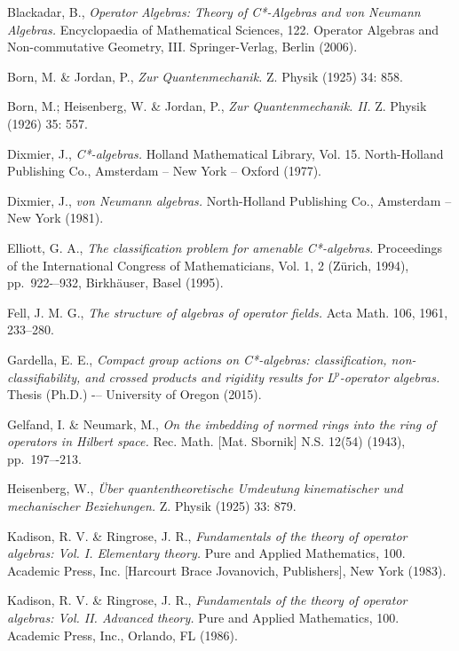 \documentclass[12pt,a4paper]{amsart}
\theoremstyle{plain}
\theoremstyle{definition}
\begin{document}
	


\begin{thebibliography}{00}
	Blackadar, B.,
	\emph{Operator Algebras: Theory of C*-Algebras and von Neumann Algebras.}
	Encyclopaedia of Mathematical Sciences, 122. Operator Algebras and Non-commutative Geometry, III. Springer-Verlag, Berlin (2006).
	
	Born, M. \& Jordan, P.,
	\emph{Zur Quantenmechanik.}
	Z. Physik (1925) 34: 858.
	
	Born, M.; Heisenberg, W. \& Jordan, P.,
	\emph{Zur Quantenmechanik. II.}
	Z. Physik (1926) 35: 557.

	Dixmier, J.,
	\emph{C*-algebras.}
	Holland Mathematical Library, Vol. 15. North-Holland Publishing Co., Amsterdam -- New York -- Oxford (1977).

	Dixmier, J.,
	\emph{von Neumann algebras.}
	North-Holland Publishing Co., Amsterdam -- New York (1981).
		
	Elliott, G. A.,
	\emph{The classification problem for amenable C*-algebras.}
	Proceedings of the International Congress of Mathematicians, Vol. 1, 2 (Z\"{u}rich, 1994), pp.~922-–932, Birkhäuser, Basel (1995).

	Fell, J. M. G.,
	\emph{The structure of algebras of operator fields. }
	Acta Math. 106, 1961, 233–280. 


	Gardella, E. E.,
	\emph{Compact group actions on C*-algebras: classification, non-classifiability, and crossed products and rigidity results for L$^p$-operator algebras. }
	Thesis (Ph.D.) -– University of Oregon (2015).

	Gelfand, I. \& Neumark, M.,
	\emph{On the imbedding of normed rings into the ring of operators in Hilbert space.}
	Rec. Math. [Mat. Sbornik] N.S. 12(54) (1943), pp.~197–-213.

	Heisenberg, W.,
	\emph{{\"U}ber quantentheoretische Umdeutung kinematischer und mechanischer Beziehungen.}
	Z. Physik (1925) 33: 879. 
	
	Kadison, R. V. \& Ringrose, J. R.,
	\emph{Fundamentals of the theory of operator algebras: Vol. I. Elementary theory.}
	Pure and Applied Mathematics, 100. Academic Press, Inc. [Harcourt Brace Jovanovich, Publishers], New York (1983).

	Kadison, R. V. \& Ringrose, J. R.,
	\emph{Fundamentals of the theory of operator algebras: Vol. II. Advanced theory.}
	Pure and Applied Mathematics, 100. Academic Press, Inc., Orlando, FL (1986).
	

\end{thebibliography}
\end{document}
